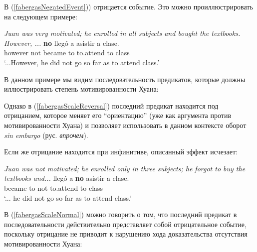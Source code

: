 \documentclass[a4paper, titlepage]{article}
\begin{document}
В (\ref{fabergasNegatedEvent})) отрицается событие. Это можно проиллюстрировать на следующем примере:

\begin{exe}
    \ex \label{fabergasScaleReversal} {\small \textit{Juan was very motivated; he enrolled in all subjects and bought the textbooks. However, ...}}
         \textbf{no} llegó a asistir a clase. \\
             however not became to to.attend to class \\
        \glt `...However, he did not go so far as to attend class.'
\end{exe}

В данном примере мы видим последовательность предикатов, которые должны иллюстрировать степень мотивированности Хуана:

\begin{exe}
\end{exe}

Однако в (\ref{fabergasScaleReversal}) последний предикат находится под отрицанием, которое меняет его ``ориентацию'' (уже как аргумента против мотивированности Хуана) и позволяет использовать в данном контексте оборот \textit{sin embargo} (рус. \textit{впрочем}). 

\medskip

Если же отрицание находится при инфинитиве, описанный эффект исчезает:

\begin{exe}
    \ex \label{fabergasScaleNormal} {\small \textit{Juan was not motivated; he enrolled only in three subjects; he forgot to buy the textbooks and...}}
        \gll llegó a \textbf{no} asistir a clase. \\
             became to not to.attend to class \\
        \glt `... he did not go so far as to attend class.'
\end{exe}

В (\ref{fabergasScaleNormal}) можно говорить о том, что последний предикат в последовательности действительно представляет собой отрицательное событие, поскольку отрицание не приводит к нарушению хода доказательства отсутствия мотивированности Хуана:

\begin{exe}
\end{exe}
\end{document}
